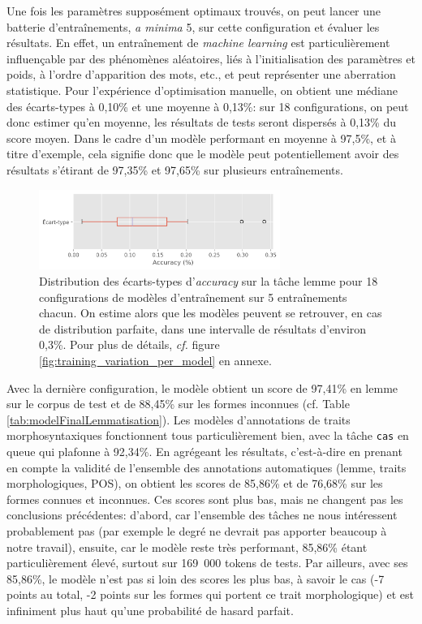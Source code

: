 Une fois les paramètres supposément optimaux trouvés, on peut lancer une batterie d'entraînements, \textit{a minima} 5, sur cette configuration et évaluer les résultats. En effet, un entraînement de \textit{machine learning }est particulièrement influençable par des phénomènes aléatoires, liés à l'initialisation des paramètres et poids, à l'ordre d'apparition des mots, etc., et peut représenter une aberration statistique. Pour l'expérience d'optimisation manuelle, on obtient une médiane des écarts-types à 0,10\% et une moyenne à 0,13\%: sur 18 configurations, on peut donc estimer qu'en moyenne, les résultats de tests seront dispersés à 0,13\% du score moyen. Dans le cadre d'un modèle performant en moyenne à 97,5\%, et à titre d'exemple, cela signifie donc que le modèle peut potentiellement avoir des résultats s'étirant de 97,35\% et 97,65\% sur plusieurs entraînements.

\begin{figure}[ht]
    \centering
    \includegraphics[width=0.7\textwidth]{results/lemmatisation/entrainement/Variance.png}
    \caption{Distribution des écarts-types d'\textit{accuracy} sur la tâche lemme pour 18 configurations de modèles d'entraînement sur 5 entraînements chacun. On estime alors que les modèles peuvent se retrouver, en cas de distribution parfaite, dans une intervalle de résultats d'environ 0,3\%. Pour plus de détails, \textit{cf.} figure \ref{fig:training_variation_per_model} en annexe.}
    \label{fig:training_variation}
\end{figure}

Avec la dernière configuration, le modèle obtient un score de 97,41\% en lemme sur le corpus de test et de 88,45\% sur les formes inconnues (cf. Table \ref{tab:modelFinalLemmatisation}). Les modèles d'annotations de traits morphosyntaxiques fonctionnent tous particulièrement bien, avec la tâche \texttt{cas} en queue qui plafonne à 92,34\%. En agrégeant les résultats, c'est-à-dire en prenant en compte la validité de l'ensemble des annotations automatiques (lemme, traits morphologiques, POS), on obtient les scores de 85,86\% et de 76,68\% sur les formes connues et inconnues. Ces scores sont plus bas, mais ne changent pas les conclusions précédentes: d'abord, car l'ensemble des tâches ne nous intéressent probablement pas (par exemple le degré ne devrait pas apporter beaucoup à notre travail), ensuite, car le modèle reste très performant, 85,86\% étant particulièrement élevé, surtout sur 169~000 tokens de tests. Par ailleurs, avec ses 85,86\%, le modèle n'est pas si loin des scores les plus bas, à savoir le cas (-7 points au total, -2 points sur les formes qui portent ce trait morphologique) et est infiniment plus haut qu'une probabilité de hasard parfait.

